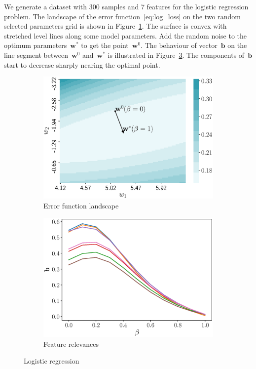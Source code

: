 \documentclass[a4paper,12pt]{article}
\theoremstyle{plain} %
\theoremstyle{definition} %
\theoremstyle{remark} %
\newcommand{\bb}{\mathbf{b}}
\newcommand{\bw}{\mathbf{w}}
\begin{document}
  	We generate a dataset with 300 samples and 7 features for the logistic regression problem. 
  	The landscape of the error function~\eqref{eq:log_loss} on the two random selected parameters grid is shown in Figure~\ref{fig:log_reg_error}.
  	The surface is convex with stretched level lines along some model parameters.
  	Add the random noise to the optimum parameters~$\bw^*$ to get the point~$\bw^0$. The behaviour of vector~$\bb$ on the line segment between~$\bw^0$ and~$\bw^*$ is illustrated in Figure~\ref{fig:log_reg_b_wrt_beta}.
  	The components of~$\bb$ start to decrease sharply nearing the optimal point.
	\begin{figure}[!h]
		\centering
		\begin{subfigure}{.5\textwidth}
			\centering
			\includegraphics[width=\linewidth]{figs/log_reg_error}
			\caption{Error function landscape}
			\label{fig:log_reg_error}
		\end{subfigure}%
		\begin{subfigure}{.5\textwidth}
			\centering
			\includegraphics[width=\linewidth]{figs/log_reg_b_wrt_beta.eps}
			\caption{Feature relevances}
			\label{fig:log_reg_b_wrt_beta}
		\end{subfigure}
		\caption{Logistic regression}
	\end{figure}
  	
\end{document}
